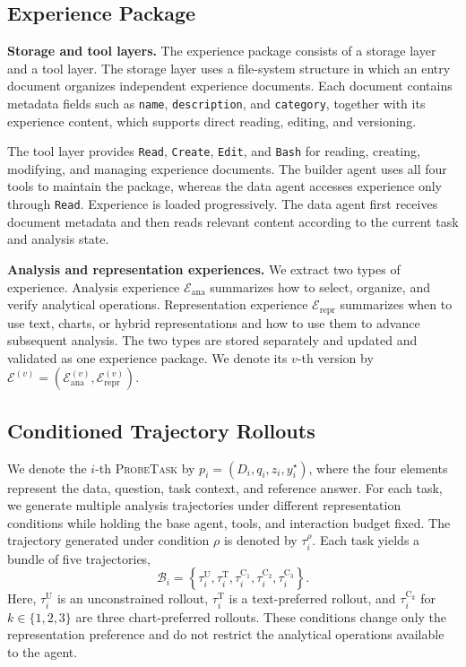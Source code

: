 \documentclass{article}
\newcommand{\probe}{\textsc{ProbeTask}}
\begin{document}
\subsection{Experience Package}
\label{sec:experience-package}

\noindent\textbf{Storage and tool layers.}
The experience package consists of a storage layer and a tool layer.
The storage layer uses a file-system structure in which an entry document organizes independent experience documents.
Each document contains metadata fields such as \texttt{name}, \texttt{description}, and \texttt{category}, together with its experience content, which supports direct reading, editing, and versioning.

The tool layer provides \texttt{Read}, \texttt{Create}, \texttt{Edit}, and \texttt{Bash} for reading, creating, modifying, and managing experience documents.
The builder agent uses all four tools to maintain the package, whereas the data agent accesses experience only through \texttt{Read}.
Experience is loaded progressively.
The data agent first receives document metadata and then reads relevant content according to the current task and analysis state.

\noindent\textbf{Analysis and representation experiences.}
We extract two types of experience.
Analysis experience $\mathcal{E}_{\mathrm{ana}}$ summarizes how to select, organize, and verify analytical operations.
Representation experience $\mathcal{E}_{\mathrm{repr}}$ summarizes when to use text, charts, or hybrid representations and how to use them to advance subsequent analysis.
The two types are stored separately and updated and validated as one experience package.
We denote its $v$-th version by $\mathcal{E}^{(v)}=(\mathcal{E}_{\mathrm{ana}}^{(v)},\mathcal{E}_{\mathrm{repr}}^{(v)})$.

\subsection{Conditioned Trajectory Rollouts}
\label{sec:conditioned-rollouts}

We denote the $i$-th \probe{} by $p_i=(D_i,q_i,z_i,y_i^{\star})$, where the four elements represent the data, question, task context, and reference answer.
For each task, we generate multiple analysis trajectories under different representation conditions while holding the base agent, tools, and interaction budget fixed.
The trajectory generated under condition $\rho$ is denoted by $\tau_i^{\rho}$.
Each task yields a bundle of five trajectories,
\begin{equation}
\mathcal{B}_i=
\left\{
\tau_i^{\mathrm{U}},
\tau_i^{\mathrm{T}},
\tau_i^{\mathrm{C}_1},
\tau_i^{\mathrm{C}_2},
\tau_i^{\mathrm{C}_3}
\right\}.
\end{equation}
Here, $\tau_i^{\mathrm{U}}$ is an unconstrained rollout, $\tau_i^{\mathrm{T}}$ is a text-preferred rollout, and $\tau_i^{\mathrm{C}_k}$ for $k\in\{1,2,3\}$ are three chart-preferred rollouts.
These conditions change only the representation preference and do not restrict the analytical operations available to the agent.
\end{document}
